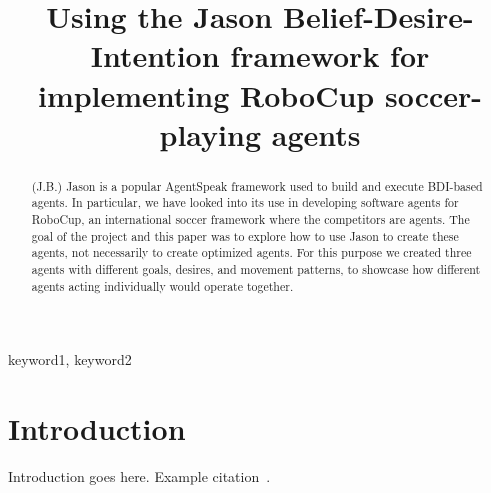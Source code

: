 \documentclass[conference]{IEEEtran}
\begin{document}
\title{Using the Jason Belief-Desire-Intention framework for implementing RoboCup soccer-playing agents\\
}

\author{
\and
{}
\and
{}
\and
{}
}

\maketitle

\begin{abstract}
(J.B.) Jason is a popular AgentSpeak framework used to build and execute BDI-based agents.
In particular, we have looked into its use in developing software agents for RoboCup, an international soccer framework where the competitors are agents.
The goal of the project and this paper was to explore how to use Jason to create these agents, not necessarily to create optimized agents.
For this purpose we created three agents with different goals, desires, and movement patterns, to showcase how different agents acting individually would operate together.
\end{abstract}

\begin{IEEEkeywords}
keyword1, keyword2
\end{IEEEkeywords}

\section{Introduction}
Introduction goes here. Example citation~\cite{b1}.
\end{document}
